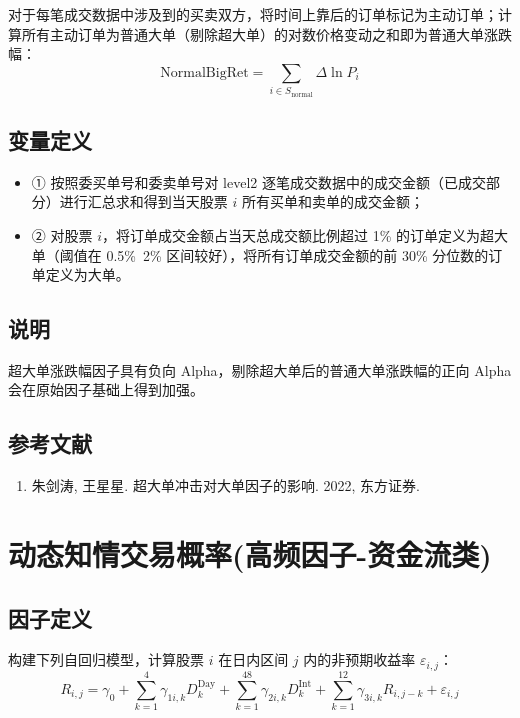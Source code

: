 \documentclass{article}
\begin{document}
对于每笔成交数据中涉及到的买卖双方，将时间上靠后的订单标记为主动订单；计算所有主动订单为普通大单（剔除超大单）的对数价格变动之和即为普通大单涨跌幅：
\begin{equation}
    \mathrm{NormalBigRet} = \sum_{i \in S_{\mathrm{normal}}} \Delta \ln P_i
\end{equation}

\subsection{变量定义}
\begin{itemize}
    \item ① 按照委买单号和委卖单号对 level2 逐笔成交数据中的成交金额（已成交部分）进行汇总求和得到当天股票 \( i \) 所有买单和卖单的成交金额；
    \item ② 对股票 \( i \)，将订单成交金额占当天总成交额比例超过 1\% 的订单定义为超大单（阈值在 0.5\%~2\% 区间较好），将所有订单成交金额的前 30\% 分位数的订单定义为大单。
\end{itemize}

\subsection{说明}
超大单涨跌幅因子具有负向 Alpha，剔除超大单后的普通大单涨跌幅的正向 Alpha 会在原始因子基础上得到加强。

\subsection{参考文献}
\begin{enumerate}
    \item 朱剑涛, 王星星. 超大单冲击对大单因子的影响. 2022, 东方证券.
\end{enumerate}

\section{动态知情交易概率(高频因子-资金流类)}

\subsection{因子定义}

构建下列自回归模型，计算股票 \( i \) 在日内区间 \( j \) 内的非预期收益率 \( \varepsilon_{i,j} \)：
\begin{equation}
    R_{i,j} = \gamma_0 + \sum_{k=1}^{4} \gamma_{1i,k} D_k^{\mathrm{Day}} + \sum_{k=1}^{48} \gamma_{2i,k} D_k^{\mathrm{Int}} + \sum_{k=1}^{12} \gamma_{3i,k} R_{i,j-k} + \varepsilon_{i,j}
\end{equation}
\end{document}
